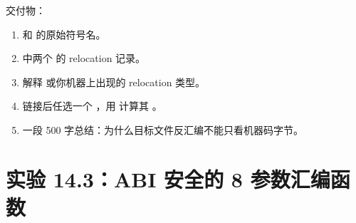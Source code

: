 \begin{labbox}
交付物：

\begin{enumerate}
  \item {} 和  的原始符号名。
  \item {} 中两个  的 relocation 记录。
  \item 解释  或你机器上出现的 relocation 类型。
  \item 链接后任选一个 ，用  计算其 。
  \item 一段 500 字总结：为什么目标文件反汇编不能只看机器码字节。
\end{enumerate}
\end{labbox}

\section{实验 14.3：ABI 安全的 8 参数汇编函数}

